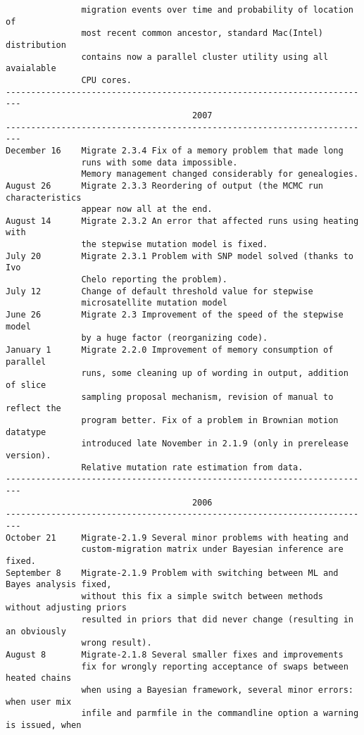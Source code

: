 \begin{small}
\begin{verbatim}
               migration events over time and probability of location of
               most recent common ancestor, standard Mac(Intel) distribution
               contains now a parallel cluster utility using all avaialable
               CPU cores. 
-------------------------------------------------------------------------
                                     2007
-------------------------------------------------------------------------
December 16    Migrate 2.3.4 Fix of a memory problem that made long 
               runs with some data impossible.
               Memory management changed considerably for genealogies. 
August 26      Migrate 2.3.3 Reordering of output (the MCMC run characteristics
               appear now all at the end.
August 14      Migrate 2.3.2 An error that affected runs using heating with 
               the stepwise mutation model is fixed.
July 20        Migrate 2.3.1 Problem with SNP model solved (thanks to Ivo 
               Chelo reporting the problem).
July 12        Change of default threshold value for stepwise 
               microsatellite mutation model
June 26        Migrate 2.3 Improvement of the speed of the stepwise model 
               by a huge factor (reorganizing code).
January 1      Migrate 2.2.0 Improvement of memory consumption of parallel
               runs, some cleaning up of wording in output, addition of slice
               sampling proposal mechanism, revision of manual to reflect the
               program better. Fix of a problem in Brownian motion datatype
               introduced late November in 2.1.9 (only in prerelease version).
               Relative mutation rate estimation from data.  
-------------------------------------------------------------------------
                                     2006
-------------------------------------------------------------------------
October 21     Migrate-2.1.9 Several minor problems with heating and 
               custom-migration matrix under Bayesian inference are fixed.
September 8    Migrate-2.1.9 Problem with switching between ML and Bayes analysis fixed,
               without this fix a simple switch between methods without adjusting priors
               resulted in priors that did never change (resulting in an obviously 
               wrong result).
August 8       Migrate-2.1.8 Several smaller fixes and improvements
               fix for wrongly reporting acceptance of swaps between heated chains
               when using a Bayesian framework, several minor errors: when user mix 
               infile and parmfile in the commandline option a warning is issued, when 

\end{verbatim}
\end{small}
